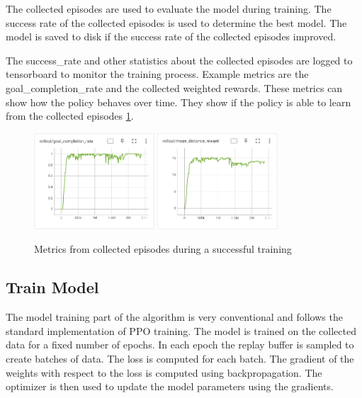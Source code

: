 The collected episodes are used to evaluate the model during training. The success rate of the collected episodes is used to determine the best model. The model is saved to disk if the success rate of the collected episodes improved.


The success\_rate and other statistics about the collected episodes are logged to tensorboard to monitor the training process. Example metrics are the goal\_completion\_rate and the collected weighted rewards.
These metrics can show how the policy behaves over time. They show if the policy is able to learn from the collected episodes \ref{fig:metrics_over_time}.

\begin{figure}
    \centering
    \includegraphics[width=0.4\textwidth]{Bilder/tensorboard_images/successfulTraining_goal_completion_rate.png}
    \includegraphics[width=0.4\textwidth]{Bilder/tensorboard_images/successfulTraining_distance_reward.png}
    \caption{Metrics from collected episodes during a successful training}
    \label{fig:metrics_over_time}
\end{figure}


\subsection{Train Model}

The model training part of the algorithm is very conventional and follows the standard implementation of \ac{PPO} training. The model is trained on the collected data for a fixed number of epochs. In each epoch the replay buffer is sampled to create batches of data. The loss is computed for each batch. The gradient of the weights with respect to the loss is computed using backpropagation. The optimizer is then used to update the model parameters using the gradients.

